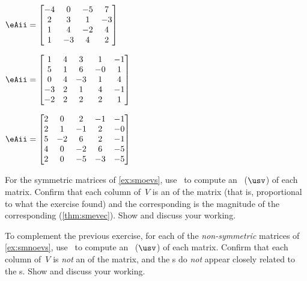 \begin{exercise}
\begin{parts}
\item \(\eAii=\begin{bmatrix} -4&0&-5&7
\\2&3&1&-3
\\1&4&-2&4
\\1&-3&4&2 \end{bmatrix}\)

\item \(\eAii=\begin{bmatrix} 1&4&3&1&-1
\\5&1&6&-0&1
\\0&4&-3&1&4
\\-3&2&1&4&-1
\\-2&2&2&2&1 \end{bmatrix}\)

\item \(\eAii=\begin{bmatrix} 2&0&2&-1&-1
\\2&1&-1&2&-0
\\5&-2&6&2&-1
\\4&0&-2&6&-5
\\2&0&-5&-3&-5 \end{bmatrix}\)

\end{parts}
\end{exercise}




\begin{exercise} \label{ex:} 
For the symmetric matrices of \autoref{ex:smoevs}, use \script\ to compute an \svd\ (\(\usv\)) of each matrix.
Confirm that each column of~\(V\) is an  of the matrix (that is, proportional to what the exercise found) and the corresponding  is the magnitude of the corresponding  (\autoref{thm:smevec}).
Show and discuss your working.
\end{exercise}




\begin{exercise} \label{ex:} 
To complement the previous exercise, for each of the \emph{non-symmetric} matrices of \autoref{ex:smnoevs}, use \script\ to compute an \svd\ (\(\usv\)) of each matrix.
Confirm that each column of~\(V\) is \emph{not} an  of the matrix, and the s do \emph{not} appear closely related to the s.
Show and discuss your working.
\end{exercise}











